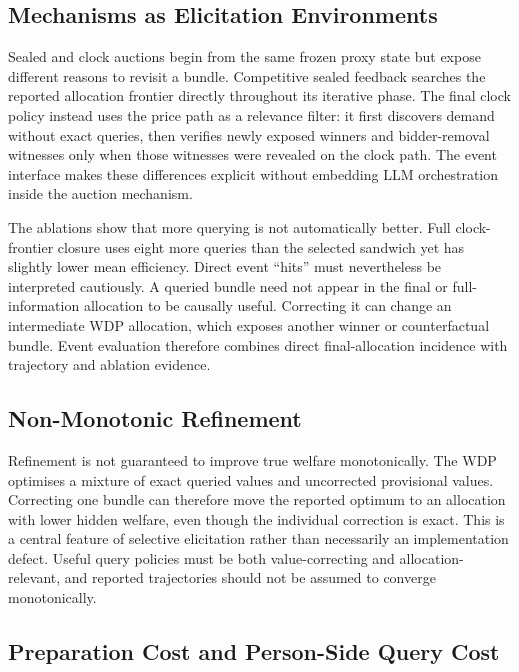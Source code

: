 \subsection{Mechanisms as Elicitation Environments}

Sealed and clock auctions begin from the same frozen proxy state but expose
different reasons to revisit a bundle. Competitive sealed feedback searches
the reported allocation frontier directly throughout its iterative phase.
The final clock policy instead uses the price path as a relevance filter: it
first discovers demand without exact queries, then verifies newly exposed
winners and bidder-removal witnesses only when those witnesses were revealed
on the clock path. The event interface makes these differences explicit
without embedding LLM orchestration inside the auction mechanism.

The ablations show that more querying is not automatically better. Full
clock-frontier closure uses eight more queries than the selected sandwich yet
has slightly lower mean efficiency. Direct event ``hits'' must nevertheless
be interpreted cautiously. A queried
bundle need not appear in the final or full-information allocation to be
causally useful. Correcting it can change an intermediate WDP allocation,
which exposes another winner or counterfactual bundle. Event evaluation
therefore combines direct final-allocation incidence with trajectory and
ablation evidence.

\subsection{Non-Monotonic Refinement}

Refinement is not guaranteed to improve true welfare monotonically. The WDP
optimises a mixture of exact queried values and uncorrected provisional
values. Correcting one bundle can therefore move the reported optimum to an
allocation with lower hidden welfare, even though the individual correction
is exact. This is a central feature of selective elicitation rather than
necessarily an implementation defect. Useful query policies must be both
value-correcting and allocation-relevant, and reported trajectories should
not be assumed to converge monotonically.

\subsection{Preparation Cost and Person-Side Query Cost}

